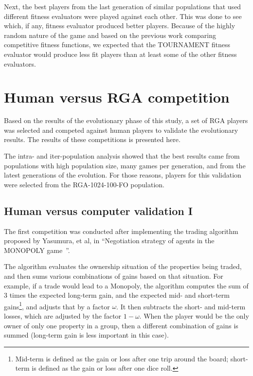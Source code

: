Next, the best players from the last generation of similar populations that used
different fitness evaluators were played against each other. This was done to
see which, if any, fitness evaluator produced better players. Because of the
highly random nature of the game and based on the previous work comparing
competitive fitness functions, we expected that the TOURNAMENT fitness evaluator
would produce less fit players than at least some of the other fitness
evaluators.


\section{Human versus RGA competition}

Based on the results of the evolutionary phase of this study, a set of RGA
players was selected and competed against human players to validate the
evolutionary results. The results of these competitions is presented here.

The intra- and iter-population analysis showed that the best results came from
populations with high population size, many games per generation, and from the
latest generations of the evolution. For those reasons, players for this
validation were selected from the RGA-1024-100-FO population. 

\subsection{Human versus computer validation I}

The first competition was conducted after implementing the trading algorithm
proposed by Yasumura, et al, in ``Negotiation strategy of agents in the MONOPOLY
game~\cite{Yasumura2001Negotiate}''. 

The algorithm evaluates the ownership situation of the properties being traded,
and then sums various combinations of gains based on that situation. For
example, if a trade would lead to a Monopoly, the algorithm computes the sum of
3 times the expected long-term gain, and the expected mid- and short-term
gains\footnote{Mid-term is defined as the gain or loss after one trip around the
board; short-term is defined as the gain or loss after one dice roll.}, and
adjusts that by a factor \(\omega\). It then subtracts the short- and mid-term
losses, which are adjusted by the factor \(1-\omega\). When the player would be
the only owner of only one property in a group, then a different combination of
gains is summed (long-term gain is less important in this case).

